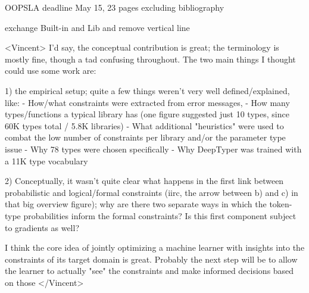  
OOPSLA deadline May 15, 23 pages excluding bibliography

exchange Built-in and Lib and remove vertical line

<Vincent>
I'd say, the conceptual contribution is great; the terminology is mostly
fine, though a tad confusing throughout. The two main things I thought could
use some work are:

1) the empirical setup; quite a few things weren't very well
defined/explained, like:
  - How/what constraints were extracted from error messages,
  - How many types/functions a typical library has (one figure suggested
just 10 types, since 60K types total / 5.8K libraries)
  - What additional "heuristics" were used to combat the low number of
constraints per library and/or the parameter type issue
  - Why 78 types were chosen specifically
  - Why DeepTyper was trained with a 11K type vocabulary
  
2) Conceptually, it wasn't quite clear what happens in the first link
between probabilistic and logical/formal constraints (iirc, the arrow
between b) and c) in that big overview figure); why are there two separate
ways in which the token-type probabilities inform the formal constraints? Is
this first component subject to gradients as well?

I think the core idea of jointly optimizing a machine learner with insights
into the constraints of its target domain is great. Probably the next step
will be to allow the learner to actually "see" the constraints and make
informed decisions based on those </Vincent>
